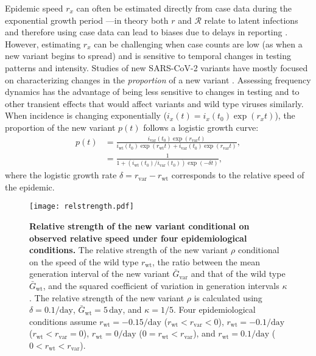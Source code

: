 \documentclass[12pt]{article}
\newcommand{\vvvar}{\mathrm{var}}
\newcommand{\wwwt}{\mathrm{wt}}
\newcommand{\rx}[1]{\ensuremath{{r}_{#1}}\xspace}
\newcommand{\rw}{\rx{\wwwt}}
\newcommand{\rv}{\rx{\vvvar}}
\newcommand{\RR}{\ensuremath{{\mathcal R}}\xspace}
\newcommand{\days}{\ensuremath{\, \textrm{day}}}
\newcommand{\pday}{\ensuremath{/\textrm{day}}}
\newcommand{\ix}[1]{\ensuremath{{i}_{#1}}\xspace}
\newcommand{\iw}{\ix{\wwwt}}
\newcommand{\iv}{\ix{\vvvar}}
\newcommand{\Gx}[1]{\ensuremath{{\bar G}_{#1}}\xspace}
\newcommand{\Gw}{\Gx{\wwwt}}
\newcommand{\Gv}{\Gx{\vvvar}}
\begin{document}
Epidemic speed $r_x$ can often be estimated directly from case data during the exponential growth period \citep{mills2004transmissibility,nishiura2009transmission,ma2014estimating}---in theory both $r$ and $\RR$ relate to latent infections and therefore using case data can lead to biases due to delays in reporting \citep{goldstein2009reconstructing,gostic2020practical}.
However, estimating $r_x$ can be challenging when case counts are low (as when a new variant begins to spread) and is sensitive to temporal changes in testing patterns and intensity.
Studies of new SARS-CoV-2 variants have mostly focused on characterizing changes in the \emph{proportion} of a new variant \citep{switzerland2021variant, davies2021estimated, di2021impact, leung2021early, volz2021transmission,zhao2021}.
Assessing frequency dynamics has the advantage of being less sensitive to changes in testing and to other transient effects that would affect variants and wild type viruses similarly.
When incidence is changing exponentially ($i_x(t) = i_x(t_0) \exp(r_x t)$), the proportion of the new variant $p(t)$ follows a logistic growth curve:
\begin{align}
p(t) &= \frac{\iv(t_0) \exp(\rv t)}{\iw(t_0) \exp(\rw t) + \iv(t_0) \exp(\rv t)},
\\ &= \frac{1}{1 + \left(\iw(t_0)/\iv(t_0)\right) \exp(-\delta t)},
\end{align}
where the logistic growth rate $\delta = \rv - \rw$ corresponds to the relative speed of the epidemic.

\begin{figure}[!th]
\texttt{[image: relstrength.pdf]}
\caption{
\textbf{Relative strength of the new variant conditional on observed relative speed under four epidemiological conditions.}
The relative strength of the new variant $\rho$ conditional on the speed of the wild type $\rw$, the ratio between the mean generation interval of the new variant $\Gv$ and that of the wild type $\Gw$, and the squared coefficient of variation in generation intervals $\kappa$.
The relative strength of the new variant $\rho$ is calculated using $\delta=0.1\pday$, $\Gw = 5\days$, and $\kappa = 1/5$.
Four epidemiological conditions assume $\rw=-0.15\pday$ ($\rw < \rv < 0$), $\rw=-0.1\pday$ ($\rw < \rv = 0$), $\rw=0\pday$ ($0 = \rw < \rv$), and $\rw=0.1\pday$ ($0 < \rw < \rv$).
}
\label{fig:relstrength}
\end{figure}
\end{document}
